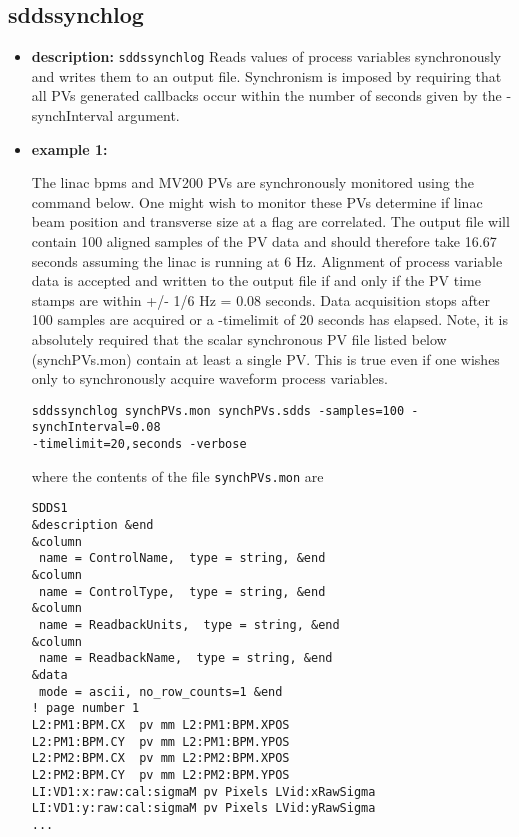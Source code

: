 %
%
\begin{latexonly}
\newpage
\end{latexonly}

%
%
\subsection{sddssynchlog}
\label{sddssynchlog}

\begin{itemize}
\item {\bf description:}
%
%
\verb+sddssynchlog+ Reads values of process variables synchronously
and writes them to an output file.  Synchronism is imposed by
requiring that all PVs generated callbacks occur within the number of
seconds given by the -synchInterval argument.
\item {\bf example 1:} 
%
% 
%

The linac bpms and MV200 PVs are synchronously monitored using the
command below.  One might wish to monitor these PVs determine if linac
beam position and transverse size at a flag are correlated.  The
output file will contain 100 aligned samples of the PV data and should
therefore take 16.67 seconds assuming the linac is running at 6 Hz.
Alignment of process variable data is accepted and written to the
output file if and only if the PV time stamps are within +/- 1/6 Hz =
0.08 seconds.  Data acquisition stops after 100 samples are acquired
or a -timelimit of 20 seconds has elapsed.  Note, it is absolutely
required that the scalar synchronous PV file listed below
(synchPVs.mon) contain at least a single PV.  This is true even if one
wishes only to synchronously acquire waveform process variables.
\begin{verbatim}
sddssynchlog synchPVs.mon synchPVs.sdds -samples=100 -synchInterval=0.08 
-timelimit=20,seconds -verbose
\end{verbatim}
where the contents of the file \verb+synchPVs.mon+ are
\begin{verbatim}
SDDS1
&description &end
&column
 name = ControlName,  type = string, &end
&column
 name = ControlType,  type = string, &end
&column
 name = ReadbackUnits,  type = string, &end
&column
 name = ReadbackName,  type = string, &end
&data
 mode = ascii, no_row_counts=1 &end
! page number 1
L2:PM1:BPM.CX  pv mm L2:PM1:BPM.XPOS 
L2:PM1:BPM.CY  pv mm L2:PM1:BPM.YPOS 
L2:PM2:BPM.CX  pv mm L2:PM2:BPM.XPOS 
L2:PM2:BPM.CY  pv mm L2:PM2:BPM.YPOS 
LI:VD1:x:raw:cal:sigmaM pv Pixels LVid:xRawSigma 
LI:VD1:y:raw:cal:sigmaM pv Pixels LVid:yRawSigma 
...


\end{verbatim}
\end{itemize}
